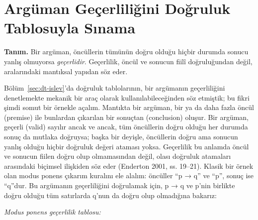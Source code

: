 \section{Argüman Geçerliliğini Doğruluk Tablosuyla Sınama}\label{sec:gecerlilik}

\begin{tcolorbox}[bookbox,colback=cDef]
\textbf{\textsf{\textcolor{cAcc}{Tanım.}}}\quad
Bir argüman, öncüllerin tümünün doğru olduğu hiçbir durumda sonucu yanlış olmuyorsa \emph{geçerlidir}. Geçerlilik, öncül ve sonucun fiilî doğruluğundan değil, aralarındaki mantıksal yapıdan söz eder.
\end{tcolorbox}

Bölüm~\ref{sec:dt-islev}’da doğruluk tablolarının, bir argümanın geçerliliğini denetlemekte mekanik bir araç olarak kullanılabileceğinden söz etmiştik; bu fikri şimdi somut bir örnekle açalım. Mantıkta bir argüman, bir ya da daha fazla öncül (premise) ile bunlardan çıkarılan bir sonuçtan (conclusion) oluşur. Bir argüman, geçerli (valid) sayılır ancak ve ancak, tüm öncüllerin doğru olduğu her durumda sonuç da mutlaka doğruysa; başka bir deyişle, öncüllerin doğru ama sonucun yanlış olduğu hiçbir doğruluk değeri ataması yoksa. Geçerlilik bu anlamda öncül ve sonucun fiilen doğru olup olmamasından değil, olası doğruluk atamaları arasındaki biçimsel ilişkiden söz eder (Enderton 2001, ss. 19–21). Klasik bir örnek olan modus ponens çıkarım kuralını ele alalım: öncüller “p → q” ve “p”, sonuç ise “q”dur. Bu argümanın geçerliliğini doğrulamak için, p → q ve p’nin birlikte doğru olduğu tüm satırlarda q’nun da doğru olup olmadığına bakarız:

\par\smallskip\begin{center}{\small\itshape\sffamily\color{gray}Modus ponens geçerlilik tablosu:}\par{}\end{center}\par\smallskip


